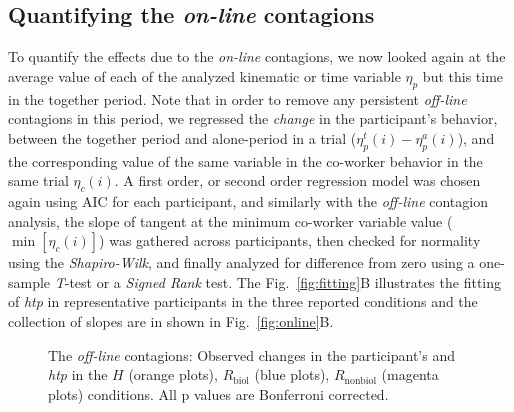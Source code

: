 \subsection{Quantifying the \textit{on-line} contagions}

To quantify the effects due to the \textit{on-line} contagions, we now looked again at the average value of each of the analyzed kinematic or time variable $\eta_p$ but this time in the together period. Note that in order to remove any persistent \textit{off-line} contagions in this period, we regressed the \textit{change} in the participant's behavior, between the together period and alone-period in a trial ($\eta_p^t (i)- \eta_p^a (i)$), and the corresponding value of the same variable in the co-worker behavior in the same trial $\eta_c(i)$. A first order, or second order regression model was chosen again using AIC for each participant, and similarly with the \textit{off-line} contagion analysis, the slope of tangent at the minimum co-worker variable value ($\min[\eta_c(i)]$) was gathered across participants, then checked for normality using the {\it Shapiro-Wilk}, and finally analyzed for difference from zero using a one-sample {\it T}-test or a {\it Signed Rank} test. The Fig.~\ref{fig:fitting}B illustrates the fitting of {\it htp} in representative participants in the three reported conditions and the collection of slopes are in shown in Fig.~\ref{fig:online}B.

\begin{figure}[t]
	\caption{The \textit{off-line} contagions: Observed changes in the participant's  and \textit{htp} in the $\textit{H}$ (orange plots), $\textit{R}_{\text{biol}}$ (blue plots), $\textit{R}_{\text{nonbiol}}$ (magenta plots) conditions. All p values are Bonferroni corrected.}
	\label{fig:offline}
\end{figure}

